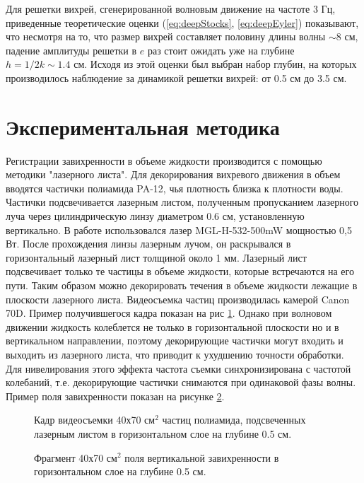 Для решетки вихрей, сгенерированной волновым движение на частоте 3 Гц, приведенные теоретические оценки (\ref{eq:deepStocks}, \ref{eq:deepEyler}) показывают, что несмотря на то, что размер вихрей составляет половину длины волны $\sim 8$ см, падение амплитуды решетки в $e$ раз стоит ожидать уже на глубине $h = 1/2k \sim 1.4$ см. Исходя из этой оценки был выбран набор глубин, на которых производилось наблюдение за динамикой решетки вихрей: от 0.5 см до 3.5 см.

\section{Экспериментальная методика} \label{sect6_2}
Регистрации завихренности в объеме жидкости производится с помощью методики "лазерного листа". Для декорирования вихревого движения в объем вводятся частички полиамида PA-12, чья плотность близка к плотности воды. Частички подсвечивается лазерным листом, полученным пропусканием лазерного луча через цилиндрическую линзу диаметром 0.6 см, установленную вертикально. В работе использовался лазер MGL-H-532-500mW мощностью 0,5 Вт. После прохождения линзы лазерным лучом, он раскрывался в горизонтальный лазерный лист толщиной около 1 мм. Лазерный лист подсвечивает только те частицы в объеме жидкости, которые встречаются на его пути. Таким образом можно декорировать течения в объеме жидкости лежащие в плоскости лазерного листа. Видеосъемка частиц производилась камерой Canon 70D. Пример получившегося кадра показан на рис \ref{img:track0p5cm}. Однако при волновом движении жидкость колеблется не только в горизонтальной плоскости но и в вертикальном направлении, поэтому декорирующие частички могут входить и выходить из лазерного листа, что приводит к ухудшению точности обработки. Для нивелирования этого эффекта частота съемки синхронизирована с частотой колебаний, т.е. декорирующие частички снимаются при одинаковой фазы волны. Пример поля завихренности показан на рисунке \ref{img:vort0p5cm}.
\begin{figure}[ht]
 \caption{Кадр видеосъемки 40х70 см$^2$ частиц полиамида, подсвеченных лазерным листом в горизонтальном слое на глубине 0.5 см.}
 \label{img:track0p5cm} 
\end{figure}

\begin{figure}[ht]
 \caption{Фрагмент 40х70 см$^2$ поля вертикальной завихренности в горизонтальном слое на глубине 0.5 см.}
 \label{img:vort0p5cm} 
\end{figure}


